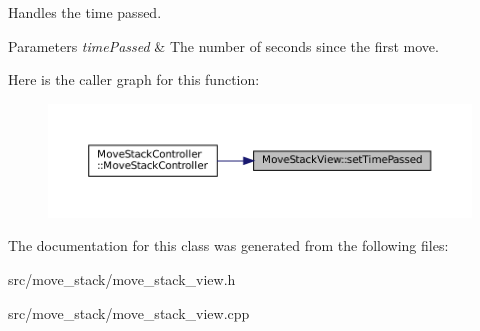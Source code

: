 Handles the time passed. 


\begin{DoxyParams}{Parameters}
{\em time\+Passed} & The number of seconds since the first move. \\
\hline
\end{DoxyParams}
Here is the caller graph for this function\+:
\nopagebreak
\begin{figure}[H]
\begin{center}
\leavevmode
\includegraphics[width=350pt]{class_move_stack_view_a6a70962da0c881426a408bb78cf9f974_icgraph}
\end{center}
\end{figure}


The documentation for this class was generated from the following files\+:\begin{DoxyCompactItemize}
\item 
src/move\+\_\+stack/move\+\_\+stack\+\_\+view.\+h\item 
src/move\+\_\+stack/move\+\_\+stack\+\_\+view.\+cpp\end{DoxyCompactItemize}
